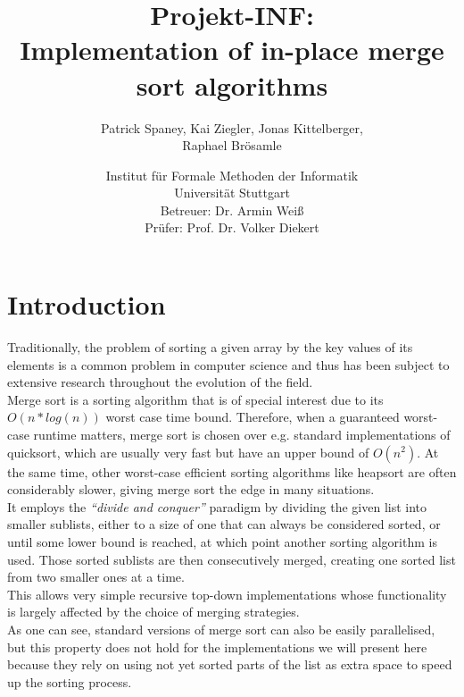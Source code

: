 \documentclass[11pt,pdftex,a4paper, twocolumn]{article}
\begin{document}
\title{Projekt-INF:\\
Implementation of in-place merge sort algorithms}
\author{Patrick Spaney, Kai Ziegler, Jonas Kittelberger, \\ Raphael Brösamle}
\date{Institut für Formale Methoden der Informatik \\ Universität Stuttgart\\
\normalsize Betreuer: Dr. Armin Weiß\\
Prüfer: Prof. Dr. Volker Diekert}
\maketitle
\section*{Introduction}
Traditionally, the problem of sorting a given array by the key values of its elements is a common problem in computer science and thus has been subject to extensive research throughout the evolution of the field. \\
Merge sort is a sorting algorithm that is of special interest due to its $O(n*log(n))$ worst case time bound. Therefore, when a guaranteed worst-case runtime matters, merge sort is chosen over e.g. standard implementations of quicksort, which are usually very fast but have an upper bound of $O(n^{2})$. At the same time, other worst-case efficient sorting algorithms like heapsort are often considerably slower, giving merge sort the edge in many situations. \\
It employs the \textit{“divide and conquer”} paradigm by dividing the given list into smaller sublists, either to a size of one that can always be considered sorted, or until some lower bound is reached, at which point another sorting algorithm is used. Those sorted sublists are then consecutively merged, creating one sorted list from two smaller ones at a time. \\
This allows very simple recursive top-down implementations whose functionality is largely affected by the choice of merging strategies. \\
As one can see, standard versions of merge sort can also be easily parallelised, but this property does not hold for the implementations we will present here because they rely on using not yet sorted parts of the list as extra space to speed up the sorting process. \\
\end{document}

